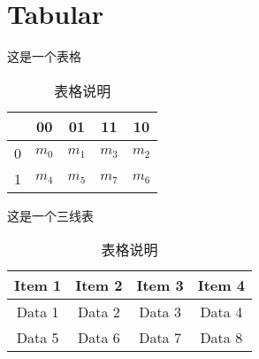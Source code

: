 \section{Tabular}

这是一个表格

\begin{table}[ht]  %
    \begin{center}
    \begin{tabular}{|c|cccc|}  %
    \hline
      & 00 & 01 & 11 & 10\\
    \hline
    0 & $m_0$ & $m_1$ & $m_3$ & $m_2$\\
    1 & $m_4$ & $m_5$ & $m_7$ & $m_6$\\
    \hline
    \end{tabular}
    \end{center}
    \caption{表格说明} 
    \label{tab:1}  %
\end{table}

这是一个三线表

\begin{table}[ht]
    \centering
    \begin{tabular}{cccc}
    \toprule  %
    Item 1 & Item 2 & Item 3 & Item 4 \\
    \midrule  %
    Data 1 & Data 2 & Data 3 & Data 4 \\
    Data 5 & Data 6 & Data 7 & Data 8 \\
    \bottomrule  %
    \end{tabular}
    \caption{表格说明}
    \label{tab:2}
\end{table}

